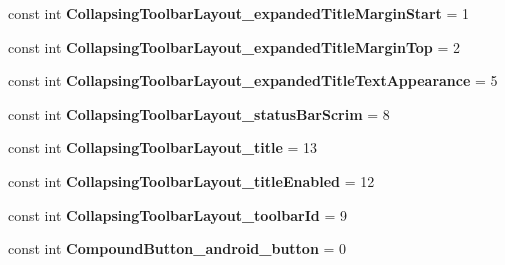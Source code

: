 \begin{DoxyCompactItemize}
\item 
\hypertarget{classClient_1_1Droid_1_1Resource_1_1Styleable_a885fdf9e284b01eb3b7324b431a1c713}{}const int {\bfseries Collapsing\+Toolbar\+Layout\+\_\+expanded\+Title\+Margin\+Start} = 1\label{classClient_1_1Droid_1_1Resource_1_1Styleable_a885fdf9e284b01eb3b7324b431a1c713}

\item 
\hypertarget{classClient_1_1Droid_1_1Resource_1_1Styleable_aa9f213396630b36145b0e954db2590ce}{}const int {\bfseries Collapsing\+Toolbar\+Layout\+\_\+expanded\+Title\+Margin\+Top} = 2\label{classClient_1_1Droid_1_1Resource_1_1Styleable_aa9f213396630b36145b0e954db2590ce}

\item 
\hypertarget{classClient_1_1Droid_1_1Resource_1_1Styleable_ae5dc014e3a1d7fb460e09bb9f967fe57}{}const int {\bfseries Collapsing\+Toolbar\+Layout\+\_\+expanded\+Title\+Text\+Appearance} = 5\label{classClient_1_1Droid_1_1Resource_1_1Styleable_ae5dc014e3a1d7fb460e09bb9f967fe57}

\item 
\hypertarget{classClient_1_1Droid_1_1Resource_1_1Styleable_a3d777f2e62d80f2d9c821b456371d27c}{}const int {\bfseries Collapsing\+Toolbar\+Layout\+\_\+status\+Bar\+Scrim} = 8\label{classClient_1_1Droid_1_1Resource_1_1Styleable_a3d777f2e62d80f2d9c821b456371d27c}

\item 
\hypertarget{classClient_1_1Droid_1_1Resource_1_1Styleable_aebd3263d7c9faef7647dcd6b6d835fb2}{}const int {\bfseries Collapsing\+Toolbar\+Layout\+\_\+title} = 13\label{classClient_1_1Droid_1_1Resource_1_1Styleable_aebd3263d7c9faef7647dcd6b6d835fb2}

\item 
\hypertarget{classClient_1_1Droid_1_1Resource_1_1Styleable_a0e2f328471021466ddc05236331094c8}{}const int {\bfseries Collapsing\+Toolbar\+Layout\+\_\+title\+Enabled} = 12\label{classClient_1_1Droid_1_1Resource_1_1Styleable_a0e2f328471021466ddc05236331094c8}

\item 
\hypertarget{classClient_1_1Droid_1_1Resource_1_1Styleable_a41573f132d98b3dd7b45d13323aaf659}{}const int {\bfseries Collapsing\+Toolbar\+Layout\+\_\+toolbar\+Id} = 9\label{classClient_1_1Droid_1_1Resource_1_1Styleable_a41573f132d98b3dd7b45d13323aaf659}

\item 
\hypertarget{classClient_1_1Droid_1_1Resource_1_1Styleable_a5fcb097220594ae552015ea33c0bb937}{}const int {\bfseries Compound\+Button\+\_\+android\+\_\+button} = 0\label{classClient_1_1Droid_1_1Resource_1_1Styleable_a5fcb097220594ae552015ea33c0bb937}


\end{DoxyCompactItemize}
